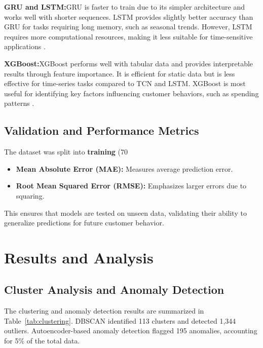 \documentclass[12pt, a4paper,twoside]{report}
\theoremstyle{plain} %
\theoremstyle{definition} %
\theoremstyle{remark} %
\numberwithin{equation}{chapter}
\begin{document}
\textbf{GRU and LSTM:}GRU is faster to train due to its simpler architecture and works well with shorter sequences. LSTM provides slightly better accuracy than GRU for tasks requiring long memory, such as seasonal trends. However, LSTM requires more computational resources, making it less suitable for time-sensitive applications \cite{cho2014gru}.

\textbf{XGBoost:}XGBoost performs well with tabular data and provides interpretable results through feature importance. It is efficient for static data but is less effective for time-series tasks compared to TCN and LSTM. XGBoost is most useful for identifying key factors influencing customer behaviors, such as spending patterns \cite{chen2016xgboost}.

\subsection{Validation and Performance Metrics}

The dataset was split into \textbf{training} (70%

\begin{itemize}
\item \textbf{Mean Absolute Error (MAE):} Measures average prediction error.
\item \textbf{Root Mean Squared Error (RMSE):} Emphasizes larger errors due to squaring.
\end{itemize}

This ensures that models are tested on unseen data, validating their ability to generalize predictions for future customer behavior.
\section{Results and Analysis}

\subsection{Cluster Analysis and Anomaly Detection}

The clustering and anomaly detection results are summarized in Table~\ref{tab:clustering}. DBSCAN identified 113 clusters and detected 1,344 outliers. Autoencoder-based anomaly detection flagged 195 anomalies, accounting for 5\% of the total data.
\end{document}
